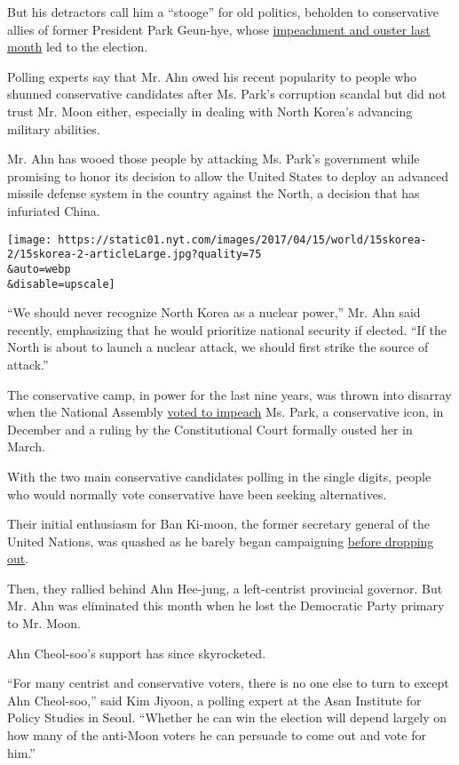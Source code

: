 But his detractors call him a ``stooge'' for old politics, beholden to
conservative allies of former President Park Geun-hye, whose
\href{https://www.nytimes.com/2017/03/09/world/asia/park-geun-hye-impeached-south-korea.html}{impeachment
and ouster last month} led to the election.

Polling experts say that Mr. Ahn owed his recent popularity to people
who shunned conservative candidates after Ms. Park's corruption scandal
but did not trust Mr. Moon either, especially in dealing with North
Korea's advancing military abilities.

Mr. Ahn has wooed those people by attacking Ms. Park's government while
promising to honor its decision to allow the United States to deploy an
advanced missile defense system in the country against the North, a
decision that has infuriated China.

\texttt{[image: https://static01.nyt.com/images/2017/04/15/world/15skorea-2/15skorea-2-articleLarge.jpg?quality=75\\\&auto=webp\\\&disable=upscale]}

``We should never recognize North Korea as a nuclear power,'' Mr. Ahn
said recently, emphasizing that he would prioritize national security if
elected. ``If the North is about to launch a nuclear attack, we should
first strike the source of attack.''

The conservative camp, in power for the last nine years, was thrown into
disarray when the National Assembly
\href{https://www.nytimes.com/2016/12/09/world/asia/south-korea-president-park-geun-hye-impeached.html}{voted
to impeach} Ms. Park, a conservative icon, in December and a ruling by
the Constitutional Court formally ousted her in March.

With the two main conservative candidates polling in the single digits,
people who would normally vote conservative have been seeking
alternatives.

Their initial enthusiasm for Ban Ki-moon, the former secretary general
of the United Nations, was quashed as he barely began campaigning
\href{https://www.nytimes.com/2017/02/01/world/asia/ban-ki-moon-president-south-korea.html}{before
dropping out}.

Then, they rallied behind Ahn Hee-jung, a left-centrist provincial
governor. But Mr. Ahn was eliminated this month when he lost the
Democratic Party primary to Mr. Moon.

Ahn Cheol-soo's support has since skyrocketed.

``For many centrist and conservative voters, there is no one else to
turn to except Ahn Cheol-soo,'' said Kim Jiyoon, a polling expert at the
Asan Institute for Policy Studies in Seoul. ``Whether he can win the
election will depend largely on how many of the anti-Moon voters he can
persuade to come out and vote for him.''

